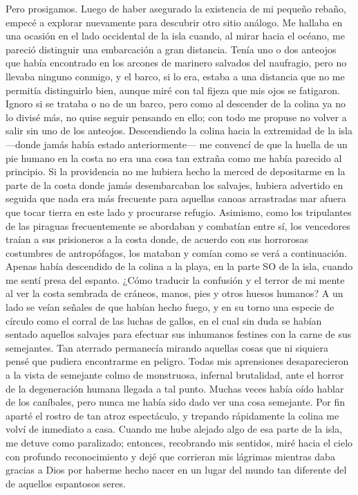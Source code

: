 \documentclass{novela}
\begin{document}
    Pero prosigamos. Luego de haber asegurado la existencia de mi pequeño rebaño, empecé a explorar nuevamente para descubrir otro sitio análogo. Me hallaba en una ocasión en el lado occidental de la isla cuando, al mirar hacia el océano, me pareció distinguir una embarcación a gran distancia. Tenía uno o dos anteojos que había encontrado en los arcones de marinero salvados del naufragio, pero no llevaba ninguno conmigo, y el barco, si lo era, estaba a una distancia que no me permitía distinguirlo bien, aunque miré con tal fijeza que mis ojos se fatigaron. Ignoro si se trataba o no de un barco, pero como al descender de la colina ya no lo divisé más, no quise seguir pensando en ello; con todo me propuse no volver a salir sin uno de los anteojos.
    Descendiendo la colina hacia la extremidad de la isla —donde jamás había estado anteriormente— me convencí de que la huella de un pie humano en la costa no era una cosa tan extraña como me había parecido al principio. Si la providencia no me hubiera hecho la merced de depositarme en la parte de la costa donde jamás desembarcaban los salvajes, hubiera advertido en seguida que nada era más frecuente para aquellas canoas arrastradas mar afuera que tocar tierra en este lado y procurarse refugio. Asimismo, como los tripulantes de las piraguas frecuentemente se abordaban y combatían entre sí, los vencedores traían a sus prisioneros a la costa donde, de acuerdo con sus horrorosas costumbres de antropófagos, los mataban y comían como se verá a continuación.
    Apenas había descendido de la colina a la playa, en la parte SO de la isla, cuando me sentí presa del espanto. ¿Cómo traducir la confusión y el terror de mi mente al ver la costa sembrada de cráneos, manos, pies y otros huesos humanos? A un lado se veían señales de que habían hecho fuego, y en su torno una especie de círculo como el corral de las luchas de gallos, en el cual sin duda se habían sentado aquellos salvajes para efectuar sus inhumanos festines con la carne de sus semejantes.
    Tan aterrado permanecía mirando aquellas cosas que ni siquiera pensé que pudiera encontrarme en peligro. Todas mis aprensiones desaparecieron a la vista de semejante colmo de monstruosa, infernal brutalidad, ante el horror de la degeneración humana llegada a tal punto. Muchas veces había oído hablar de los caníbales, pero nunca me había sido dado ver una cosa semejante. Por fin aparté el rostro de tan atroz espectáculo, y trepando rápidamente la colina me volví de inmediato a casa.
    Cuando me hube alejado algo de esa parte de la isla, me detuve como paralizado; entonces, recobrando mis sentidos, miré hacia el cielo con profundo reconocimiento y dejé que corrieran mis lágrimas mientras daba gracias a Dios por haberme hecho nacer en un lugar del mundo tan diferente del de aquellos espantosos seres.
\end{document}
